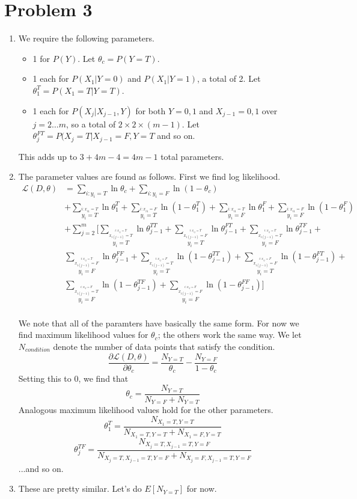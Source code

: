 \documentclass{article}
\newcommand{\dee}[2]{\frac{\partial{#1}}{\partial{#2}}}
\begin{document}
\section*{Problem 3}
\begin{enumerate}
\item We require the following parameters.
  \begin{itemize}
  \item 1 for $P(Y)$. Let $\theta_c=P(Y=T)$.
  \item 1 each for $P(X_1|Y=0)$ and $P(X_1|Y=1)$, a total of 2. Let $\theta_1^T=P(X_1=T|Y=T)$. 
  \item 1 each for $P(X_j|X_{j-1},Y)$ for both $Y=0,1$ and $X_{j-1}=0,1$
    over $j=2\ldots m$, so a total of $2\times 2\times (m-1)$. Let $\theta_j^{FT}=P(X_j=T|X_{j-1}=F,Y=T$ and so on. 
  \end{itemize}
  This adds up to $3+4m-4=4m-1$ total parameters.
\item The parameter values are found as follows. First we find log likelihood. 
\begin{align*}
\mathcal L(D,\theta) &=
\sum_{i:y_i=T}\ln \theta_c + \sum_{i:y_i=F}\ln (1-\theta_c) \\ &
+ \sum_{\stackrel{i:x_{i1}=T}{y_i=T}} \ln \theta_1^T + \sum_{\stackrel{i:x_{i1}=F}{y_i=T}}\ln(1-\theta_1^T)
+ \sum_{\stackrel{i:x_{i1}=T}{y_i=F}} \ln \theta_1^F + \sum_{\stackrel{i:x_{i1}=F}{y_i=F}}\ln(1-\theta_1^F)\\
& + \sum_{j=2}^{m} 
 \Big[ 
\sum_{\stackrel{\stackrel{i:x_{ij}=T}{x_{i(j-1)}=T}}{y_i=T}}\ln \theta_{j-1}^{TT} + 
\sum_{\stackrel{\stackrel{i:x_{ij}=T}{x_{i(j-1)}=F}}{y_i=T}}\ln \theta_{j-1}^{FT} + 
\sum_{\stackrel{\stackrel{i:x_{ij}=T}{x_{i(j-1)}=T}}{y_i=F}}\ln \theta_{j-1}^{TF} +  \\
&\sum_{\stackrel{\stackrel{i:x_{ij}=T}{x_{i(j-1)}=F}}{y_i=F}}\ln \theta_{j-1}^{FF} +  
\sum_{\stackrel{\stackrel{i:x_{ij}=F}{x_{i(j-1)}=T}}{y_i=T}}\ln (1-\theta_{j-1}^{TT}) + 
\sum_{\stackrel{\stackrel{i:x_{ij}=F}{x_{i(j-1)}=F}}{y_i=T}}\ln (1-\theta_{j-1}^{FT}) +\\ 
& \sum_{\stackrel{\stackrel{i:x_{ij}=F}{x_{i(j-1)}=T}}{y_i=F}}\ln (1-\theta_{j-1}^{TF}) + 
\sum_{\stackrel{\stackrel{i:x_{ij}=F}{x_{i(j-1)}=F}}{y_i=F}}\ln (1-\theta_{j-1}^{FF})
\Big] \\
\end{align*}

We note that all of the paramters have basically the same form. For now we find
maximum likelihood values for $\theta_c$; the others work the same way.
We let $N_{condition}$ denote the number of data points that satisfy the condition. 
$$\dee{\mathcal L(D,\theta)}{\theta_c}=\frac{N_{Y=T}}{\theta_c}-\frac{N_{Y=F}}{1-\theta_c}$$
Setting this to 0, we find that 
$$\theta_c=\frac{N_{Y=T}}{N_{Y=F}+N_{Y=T}}$$
Analogous maximum likelihood values hold for the other parameters. 
$$\theta_1^T=\frac{N_{X_1=T,Y=T}}{N_{X_1=T,Y=T}+N_{X_1=F,Y=T}}$$
$$\theta_j^{TF}=\frac{N_{X_j=T,X_{j-1}=T,Y=F}}{N_{X_j=T,X_{j-1}=T,Y=F}+N_{X_j=F,X_{j-1}=T,Y=F}}$$
...and so on. 
\item These are pretty similar. Let's do $E[N_{Y=T}]$ for now. 


\end{enumerate}
\end{document}
